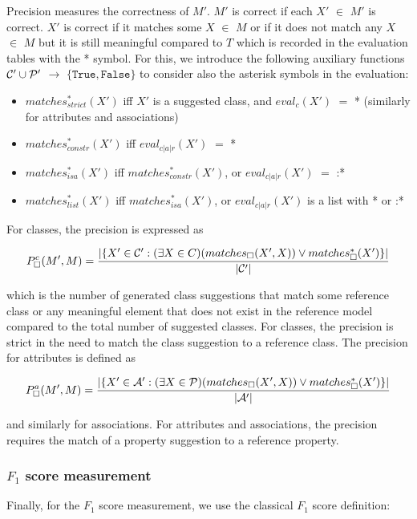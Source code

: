 Precision measures the correctness of $M'$.
$M'$ is correct if each $X'$ $\in$ $M'$ is correct.
$X'$ is correct if it matches some $X$ $\in$ $M$ or if it does not match any $X$ $\in$ $M$ but it is still meaningful compared to $T$ which is recorded in the evaluation tables with the * symbol.
For this, we introduce the following auxiliary functions ${\cal C}' \cup {\cal P}'$ $\rightarrow$ $\{\mathtt{True}, \mathtt{False}\}$ to consider also the asterisk symbols in the evaluation:
\begin{itemize}
    \item $matches^*_{strict}(X')$ iff $X'$ is a suggested class, and $eval_c(X')$ $=$ * (similarly for attributes and associations)
    \item $matches^*_{constr}(X')$ iff $eval_{c \vert a \vert r}(X')$ $=$ *
    \item $matches^*_{isa}(X')$ iff $matches^*_{constr}(X')$, or $eval_{c \vert a \vert r}(X')$ $=$ :*
    \item $matches^*_{list}(X')$ iff $matches^*_{isa}(X')$, or $eval_{c \vert a \vert r}(X')$ is a list with * or :*
\end{itemize}

For classes, the precision is expressed as

\[P^c_\Box(M',M) = \frac{\vert \{X' \in {\cal C}': (\exists X \in C)(matches_\Box(X',X)) \lor matches^*_\Box(X') \}\vert}{\vert {\cal C'} \vert}\]

\noindent which is the number of generated class suggestions that match some reference class or any meaningful element that does not exist in the reference model compared to the total number of suggested classes.
For classes, the precision is strict in the need to match the class suggestion to a reference class.
The precision for attributes is defined as

\[P^a_\Box(M',M) = \frac{\vert \{X' \in {\cal A}': (\exists X \in {\cal P})(matches_\Box(X',X)) \lor matches^*_\Box(X') \}\vert}{\vert {\cal A'} \vert}\]

\noindent and similarly for associations. For attributes and associations, the precision requires the match of a property suggestion to a reference property.


\subsubsection{$F_1$ score measurement}

Finally, for the $F_1$ score measurement, we use the classical $F_1$ score definition:

